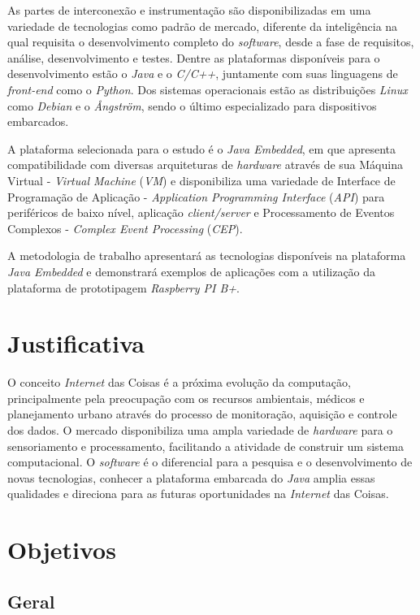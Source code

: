 As partes de interconexão e instrumentação são disponibilizadas em uma
variedade de tecnologias como padrão de mercado, diferente da inteligência na
qual requisita o desenvolvimento completo do \textit{software}, desde a fase de
requisitos, análise, desenvolvimento e testes. Dentre as plataformas
disponíveis para o desenvolvimento estão o \textit{Java} e o \textit{C/C++},
juntamente com suas linguagens de \textit{front-end} como o
\textit{Python}. Dos sistemas operacionais estão as distribuições
\textit{Linux} como \textit{Debian} e o \textit{Ångström}, sendo o último
especializado para dispositivos embarcados.

A plataforma selecionada para o estudo é o \textit{Java Embedded}, em que
apresenta compatibilidade com diversas arquiteturas de \textit{hardware}
através de sua Máquina Virtual - \textit{Virtual Machine} (\textit{VM}) e
disponibiliza uma variedade de Interface de Programação de Aplicação -
\textit{Application Programming Interface} (\textit{API}) para periféricos de
baixo nível, aplicação \textit{client/server} e Processamento de Eventos
Complexos - \textit{Complex Event Processing} (\textit{CEP}).

A metodologia de trabalho apresentará as tecnologias disponíveis na plataforma
\textit{Java Embedded} e demonstrará exemplos de aplicações com a utilização da
plataforma de prototipagem \textit{Raspberry PI B+}.

\section{Justificativa}

O conceito \textit{Internet} das Coisas é a próxima evolução da computação,
principalmente pela preocupação com os recursos ambientais, médicos e
planejamento urbano através do processo de monitoração, aquisição e controle
dos dados. O mercado disponibiliza uma ampla variedade de \textit{hardware}
para o sensoriamento e processamento, facilitando a atividade de construir um
sistema computacional. O \textit{software} é o diferencial para a pesquisa e o
desenvolvimento de novas tecnologias, conhecer a plataforma embarcada do
\textit{Java} amplia essas qualidades e direciona para as futuras oportunidades
na \textit{Internet} das Coisas.

\section{Objetivos}

\subsection{Geral}

